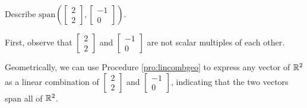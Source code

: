 \documentclass{ximera}
\begin{document}
\begin{example}\label{ex:spanr2}
Describe $\mbox{span}\left(\begin{bmatrix}2\\2\end{bmatrix}, \begin{bmatrix}-1\\0\end{bmatrix}\right)$.
\begin{explanation}
First, observe that $\begin{bmatrix}2\\2\end{bmatrix}$ and $\begin{bmatrix}-1\\0\end{bmatrix}$ are not scalar multiples of each other.  

\begin{center}
\end{center}


Geometrically, we can use Procedure \ref{pro:lincombgeo} to express any vector of $\mathbb{R}^2$ as a linear combination of $\begin{bmatrix}2\\2\end{bmatrix}$ and  $\begin{bmatrix}-1\\0\end{bmatrix}$, indicating that the two vectors span all of $\mathbb{R}^2$.


\end{explanation}
\end{example}
\end{document}
